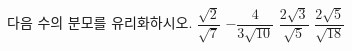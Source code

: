 다음 수의 분모를 유리화하시오.
 $\dfrac{\sqrt{2}}{\sqrt{7}}$
 $-\dfrac{4}{3\sqrt{10}}$
 $\dfrac{2\sqrt{3}}{\sqrt{5}}$
 $\dfrac{2\sqrt{5}}{\sqrt{18}}$
